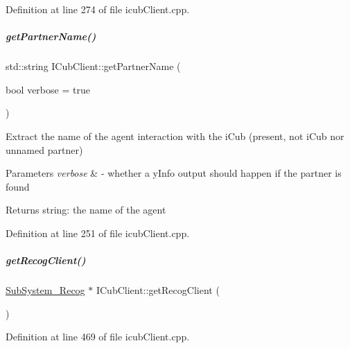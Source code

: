 Definition at line 274 of file icub\+Client.\+cpp.

\mbox{\label{group__icubclient__clients_acd076c847fe2533127ef55c8ea63034d}} 
\subparagraph{\texorpdfstring{get\+Partner\+Name()}{getPartnerName()}}
{\footnotesize\ttfamily std\+::string I\+Cub\+Client\+::get\+Partner\+Name (\begin{DoxyParamCaption}\item[{bool}]{verbose = {\ttfamily true} }\end{DoxyParamCaption})}



Extract the name of the agent interaction with the i\+Cub (present, not i\+Cub nor \textquotesingle{}unnamed\textquotesingle{} partner) 


\begin{DoxyParams}{Parameters}
{\em verbose} & -\/ whether a y\+Info output should happen if the partner is found \\
\hline
\end{DoxyParams}
\begin{DoxyReturn}{Returns}
string\+: the name of the agent 
\end{DoxyReturn}


Definition at line 251 of file icub\+Client.\+cpp.

\mbox{\label{group__icubclient__clients_aa444258246f4ed1e3569a039db6f678c}} 
\subparagraph{\texorpdfstring{get\+Recog\+Client()}{getRecogClient()}}
{\footnotesize\ttfamily \hyperlink{group__icubclient__subsystems_classicubclient_1_1SubSystem__Recog}{Sub\+System\+\_\+\+Recog} $\ast$ I\+Cub\+Client\+::get\+Recog\+Client (\begin{DoxyParamCaption}{ }\end{DoxyParamCaption})}



Definition at line 469 of file icub\+Client.\+cpp.

